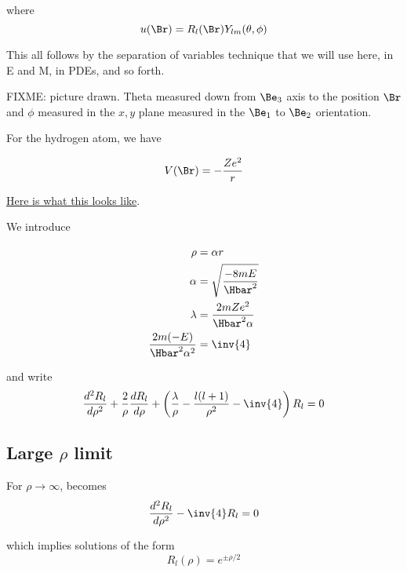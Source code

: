 where
\begin{equation}\label{eqn:PHY356FLecture10:80}
u(\Br) = R_l(\Br) Y_{lm}(\theta, \phi)
\end{equation}

This all follows by the separation of variables technique that we will use here, in E and M, in PDEs, and so forth.

FIXME: picture drawn.  Theta measured down from $\Be_3$ axis to the position $\Br$ and $\phi$ measured in the $x,y$ plane measured in the $\Be_1$ to $\Be_2$ orientation.

For the hydrogen atom, we have

\begin{equation}\label{eqn:PHY356FLecture10:90}
V(\Br) = - \frac{Z e^2}{r}
\end{equation}

\href{http://www.wolframalpha.com/input/?i=graph+-1/r}{Here is what this looks like}.

We introduce

\begin{align}\label{eqn:PHY356FLecture10:100}
\rho &= \alpha r \\
\alpha &= \sqrt{\frac{-8 m E}{\Hbar^2}} \\
\lambda &= \frac{2 m Z e^2}{\Hbar^2 \alpha} \\
\frac{2 m (- E) }{\Hbar^2 \alpha^2 } &= \inv{4}
\end{align}

and write
\begin{equation}\label{eqn:PHY356FLecture10:110}
\frac{d^2 R_l}{d\rho^2} + \frac{2}{\rho} \frac{d R_l}{d\rho} + \left( \frac{\lambda}{\rho} - \frac{l(l+1)}{\rho^2} - \inv{4} \right) R_l = 0
\end{equation}

\subsection{Large \texorpdfstring{$\rho$}{rho} limit}

For $\rho \rightarrow \infty$,  becomes
\begin{equation}\label{eqn:PHY356FLecture10:120}
\frac{d^2 R_l}{d\rho^2} - \inv{4} R_l = 0
\end{equation}

which implies solutions of the form
\begin{equation}\label{eqn:PHY356FLecture10:130}
R_l(\rho) = e^{\pm \rho/2}
\end{equation}

